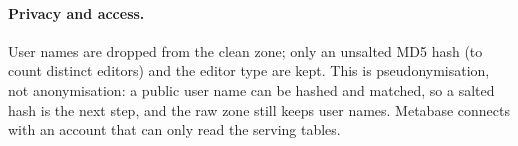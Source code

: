\paragraph{Privacy and access.} User names are dropped from the clean zone; only an unsalted MD5 hash
(to count distinct editors) and the editor type are kept. This is pseudonymisation, not anonymisation:
a public user name can be hashed and matched, so a salted hash is the next step, and the raw zone still keeps user names. Metabase connects with an account that can
only read the serving tables.

